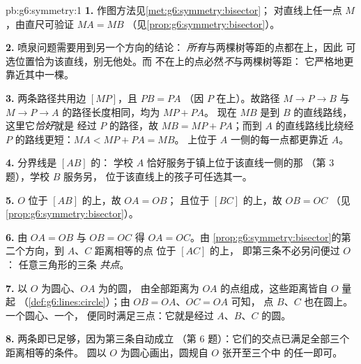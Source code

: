 \begin{solution}{pb:g6:symmetry:1}
\textbf{1.} 作图方法见\cref{met:g6:symmetry:bisector}；
对直线上任一点 $M$，由直尺可验证 $MA = MB$
（见\cref{prop:g6:symmetry:bisector}）。

\textbf{2.} 喷泉问题需要用到另一个方向的结论：
\emph{所有}与两棵树等距的点都在上，因此
可选位置恰为该直线，别无他处。而
不在上的点必然\emph{不}与两棵树等距：
它严格地更靠近其中一棵。

\textbf{3.} 两条路径共用边 $[MP]$，且 $PB = PA$
（因 $P$ 在上）。故路径 $M \to P \to B$ 与
$M \to P \to A$ 的路径长度相同，均为 $MP + PA$。
现在 $MB$ 是到 $B$ 的直线路线，这里它\emph{恰好}就是
经过 $P$ 的路径，故 $MB = MP + PA$；而到
$A$ 的直线路线比绕经 $P$ 的路线更短：$MA < MP + PA = MB$。
上位于 $A$ 一侧的每一点都更靠近 $A$。

\textbf{4.} 分界线是 $[AB]$ 的：
学校 $A$ 恰好服务于镇上位于该直线一侧的那
（第 3 题），学校 $B$ 服务另，
位于该直线上的孩子可任选其一。

\textbf{5.} $O$ 位于 $[AB]$ 的上，故 $OA = OB$；
且位于 $[BC]$ 的上，故 $OB = OC$
（见\cref{prop:g6:symmetry:bisector}）。

\textbf{6.} 由 $OA = OB$ 与 $OB = OC$ 得 $OA = OC$。由
\cref{prop:g6:symmetry:bisector}的第二个方向，到 $A$、$C$ 距离相等的点
位于 $[AC]$ 的上，
即第三条不必另问便过 $O$：
任意三角形的三条
\emph{共点}。

\textbf{7.} 以 $O$ 为圆心、$OA$ 为的圆，
由全部距离为 $OA$ 的点组成，这些距离皆自 $O$ 量起
（\cref{def:g6:lines:circle}）；由 $OB = OA$、$OC = OA$ 可知，
点 $B$、$C$ 也在圆上。一个圆心、一个，
便同时满足三点：它就是经过 $A$、$B$、$C$ 的圆。

\textbf{8.} 两条即已足够，因为第三条自动成立
（第 6 题）：它们的交点已满足全部三个距离相等的条件。
圆以 $O$ 为圆心画出，圆规自 $O$ 张开至三个中
的任一即可。


\end{solution}

